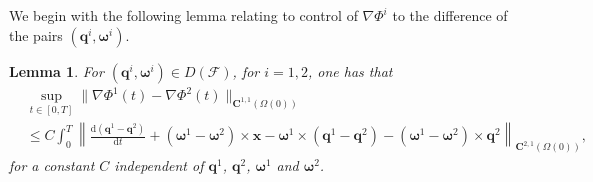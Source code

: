 \documentclass[a4paper]{amsart}
\numberwithin{equation}{section}
\newcommand{\grad}{\nabla}
\theoremstyle{plain}
\newtheorem{lemma}[theorem]{Lemma}
\newcommand{\mbf}[1]{\mathbf{#1}}
\begin{document}
We begin with the following lemma relating to control of $\grad \Phi^i$ to the difference of the pairs $(\mbf{q}^i, \boldsymbol{\omega}^i)$.
\begin{lemma}
\label{lemma: gradient difference}
    For $(\mbf{q}^i, \boldsymbol{\omega}^i) \in D(\mathscr{F})$, for $i=1,2$, one has that
	\begin{align*}
    &\sup_{t \in [0,T]} \|\grad \Phi^1(t) - \grad \Phi^2(t)\|_{\mbf{C}^{1,1}(\Omega(0))}\\
    &\leq C \int_0^T \left\| \frac{\mathrm{d}(\mbf{q}^1-\mbf{q}^2)}{\mathrm{d}t} + (\boldsymbol{\omega}^1 - \boldsymbol{\omega}^2)\times \mbf{x} - \boldsymbol{\omega}^1 \times (\mbf{q}^1 - \mbf{q}^2) - (\boldsymbol{\omega}^1 - \boldsymbol{\omega}^2)\times \mbf{q}^2  \right\|_{\mbf{C}^{2,1}(\Omega(0))},
    \end{align*}
    for a constant $C$ independent of $\mbf{q}^1$, $\mbf{q}^2$, $\boldsymbol{\omega}^1$ and $\boldsymbol{\omega}^2$.
\end{lemma}
\end{document}
